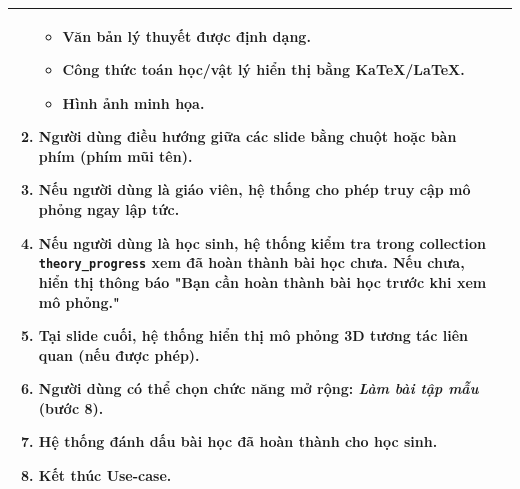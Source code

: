 \begin{longtable}{|p{}|p{}|}
\begin{enumerate}[topsep=2pt, itemsep=0pt]
\begin{itemize}[topsep=0pt, itemsep=0pt]
        \item Văn bản lý thuyết được định dạng.
        \item Công thức toán học/vật lý hiển thị bằng KaTeX/LaTeX.
        \item Hình ảnh minh họa.
    \end{itemize}
    \item Người dùng điều hướng giữa các slide bằng chuột hoặc bàn phím (phím mũi tên).
    \item Nếu người dùng là \textbf{giáo viên}, hệ thống cho phép truy cập mô phỏng ngay lập tức.
    \item Nếu người dùng là \textbf{học sinh}, hệ thống kiểm tra trong collection \texttt{theory\_progress} xem đã hoàn thành bài học chưa. Nếu chưa, hiển thị thông báo "Bạn cần hoàn thành bài học trước khi xem mô phỏng."
    \item Tại slide cuối, hệ thống hiển thị mô phỏng 3D tương tác liên quan (nếu được phép).
    \item Người dùng có thể chọn chức năng mở rộng: \textit{Làm bài tập mẫu} (bước 8).
    \item Hệ thống đánh dấu bài học đã hoàn thành cho học sinh.
    \item Kết thúc Use-case.
\end{enumerate} \\
\hline
\end{longtable}

\clearpage

